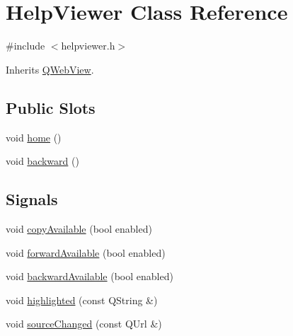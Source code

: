 \hypertarget{class_help_viewer}{}\section{Help\+Viewer Class Reference}
\label{class_help_viewer}


{\ttfamily \#include $<$helpviewer.\+h$>$}



Inherits \hyperlink{class_q_web_view}{Q\+Web\+View}.

\subsection*{Public Slots}
\begin{DoxyCompactItemize}
\item 
void \hyperlink{class_help_viewer_a4dfb871234c298b294f9fd70b5913638}{home} ()
\item 
void \hyperlink{class_help_viewer_aae2a10ffc8463decbcdcb4b87cfa30a1}{backward} ()
\end{DoxyCompactItemize}
\subsection*{Signals}
\begin{DoxyCompactItemize}
\item 
void \hyperlink{class_help_viewer_a4053444c3ccf2a5ef8422cb7bfd1dcaa}{copy\+Available} (bool enabled)
\item 
void \hyperlink{class_help_viewer_a147b483dd2a752325e3a9776f0988345}{forward\+Available} (bool enabled)
\item 
void \hyperlink{class_help_viewer_acaddb370132b3fcd7db01fa70320a1ff}{backward\+Available} (bool enabled)
\item 
void \hyperlink{class_help_viewer_ab87496c5f5aa9a99ce8961e5b60c1304}{highlighted} (const Q\+String \&)
\item 
void \hyperlink{class_help_viewer_a58c62391a49577f1bce93a23fcfbb435}{source\+Changed} (const Q\+Url \&)
\end{DoxyCompactItemize}
